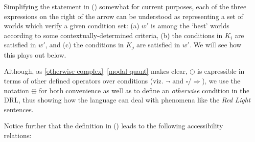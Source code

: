 Simplifying the statement in (\lastx) somewhat for current purposes, each of the three expressions on the right of the arrow can be understood as representing a set of worlds which verify a given condition set: (a) $w'$ is among the `best' worlds according to some contextually-determined criteria, (b) the conditions in $K_i$ are satisfied in $w'$, and (c) the conditions in $K_j$ are satisfied in $w'$. We will see how this plays out below.





Although, as \ref{otherwise-complex}--\ref{modal-quant} makes clear, $ \ominus $ is expressible in terms of other defined operators over conditions (viz. $ \neg\text{ and }\square/\Rightarrow $), we use the notation $ \ominus $ for both convenience as well as to define an \textit{otherwise} condition in the DRL, thus showing how the language can deal with phenomena like the \textit{Red Light} sentences. 

Notice further that the definition in (\lastx) leads to the following accessibility relations: 

